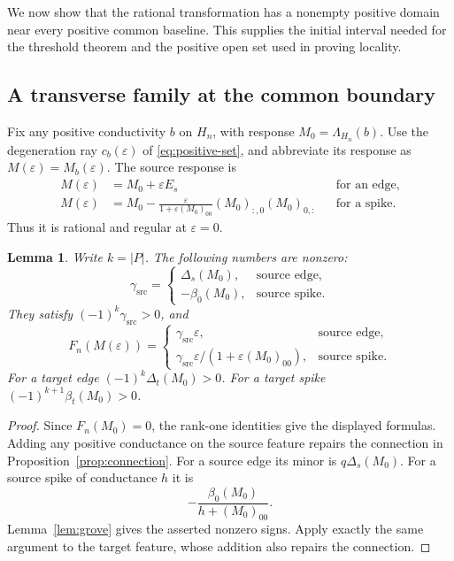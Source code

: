 \documentclass[11pt]{article}
\newtheorem{lemma}[theorem]{Lemma}
\theoremstyle{definition}
\begin{document}
We now show that the rational transformation has a nonempty positive
domain near every positive common baseline. This supplies the initial
interval needed for the threshold theorem and the positive open set
used in proving locality.

\subsection{A transverse family at the common boundary}

Fix any positive conductivity \(b\) on \(H_n\), with response
\(M_0=\Lambda_{H_n}(b)\).
Use the degeneration ray $c_b(\varepsilon)$ of
\eqref{eq:positive-set}, and abbreviate its response as
$M(\varepsilon)=M_b(\varepsilon)$.
The source response is
\begin{align}
 M(\varepsilon)&=M_0+\varepsilon E_s
 &&\text{for an edge},\label{eq:source-edge-limit}\\
 M(\varepsilon)&=M_0-
 \frac{\varepsilon}{1+\varepsilon(M_0)_{00}}
 (M_0)_{:,0}(M_0)_{0,:}
 &&\text{for a spike}.\label{eq:source-spike-limit}
\end{align}
Thus it is rational and regular at \(\varepsilon=0\).

\begin{lemma}
\label{lem:positive-leading}
Write \(k=|P|\). The following numbers are nonzero:
\[
 \gamma_{\mathrm{src}}=
 \begin{cases}
 \Delta_s(M_0),&\text{source edge},\\
 -\beta_0(M_0),&\text{source spike}.
 \end{cases}
\]
They satisfy \((-1)^k\gamma_{\mathrm{src}}>0\), and
\begin{equation}
 F_n(M(\varepsilon))=
 \begin{cases}
 \gamma_{\mathrm{src}}\varepsilon,&\text{source edge},\\
 \gamma_{\mathrm{src}}\varepsilon/(1+\varepsilon(M_0)_{00}),
     &\text{source spike}.
 \end{cases}
 \label{eq:exact-family-minor}
\end{equation}
For a target edge \((-1)^k\Delta_t(M_0)>0\).
For a target spike \((-1)^{k+1}\beta_t(M_0)>0\).
\end{lemma}
\begin{proof}
Since \(F_n(M_0)=0\), the rank-one identities give the displayed formulas.
Adding any positive conductance on the source feature repairs the
connection in Proposition~\ref{prop:connection}.
For a source edge its minor is \(q\Delta_s(M_0)\).
For a source spike of conductance \(h\) it is
\[
 -\frac{\beta_0(M_0)}{h+(M_0)_{00}}.
\]
Lemma~\ref{lem:grove} gives the asserted nonzero signs.
Apply exactly the same argument to the target feature, whose addition
also repairs the connection.
\end{proof}
\end{document}
